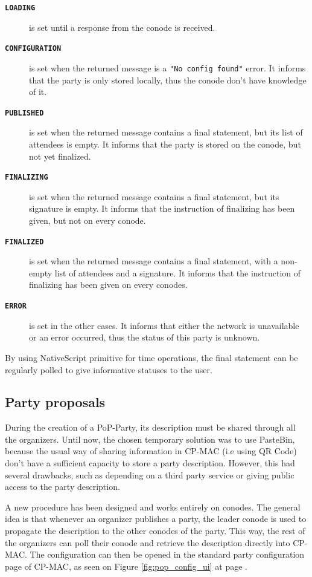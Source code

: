 \begin{description}
	\item[\textbf{\texttt{LOADING}}] is set until a response from the conode is received.
	\item[\textbf{\texttt{CONFIGURATION}}] is set when the returned message is a \texttt{"No config found"} error. It informs that the party is only stored locally, thus the conode don't have knowledge of it. 
	\item[\textbf{\texttt{PUBLISHED}}] is set when the returned message contains a final statement, but its list of attendees is empty. It informs that the party is stored on the conode, but not yet finalized.
	\item[\textbf{\texttt{FINALIZING}}] is set when the returned message contains a final statement, but its signature is empty. It informs that the instruction of finalizing has been given, but not on every conode.
	\item[\textbf{\texttt{FINALIZED}}] is set when the returned message contains a final statement, with a non-empty list of attendees and a signature. It informs that the instruction of finalizing has been given on every conodes.
	\item[\textbf{\texttt{ERROR}}] is set in the other cases. It informs that either the network is unavailable or an error occurred, thus the status of this party is unknown.
\end{description}

By using NativeScript primitive for time operations, the final statement can be regularly polled to give informative statuses to the user.

\subsection{Party proposals}
During the creation of a PoP-Party, its description must be shared through all the organizers. Until now, the chosen temporary solution was to use PasteBin, because the usual way of sharing information in CP-MAC (i.e using QR Code) don't have a sufficient capacity to store a party description. However, this had several drawbacks, such as depending on a third party service or giving public access to the party description.

A new procedure has been designed and works entirely on conodes. The general idea is that whenever an organizer publishes a party, the leader conode is used to propagate the description to the other conodes of the party. This way, the rest of the organizers can poll their conode and retrieve the description directly into CP-MAC. The configuration can then be opened in the standard party configuration page of CP-MAC, as seen on Figure \ref{fig:pop_config_ui} at page \pageref{fig:pop_config_ui}.

